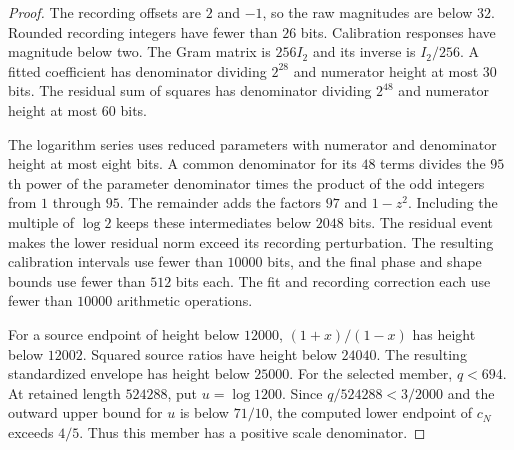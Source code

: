 \begin{proof}
The recording offsets are $2$ and $-1$, so the raw magnitudes are below $32$. Rounded recording integers have fewer than $26$ bits. Calibration responses have magnitude below two. The Gram matrix is $256I_2$ and its inverse is $I_2/256$. A fitted coefficient has denominator dividing $2^{28}$ and numerator height at most $30$ bits. The residual sum of squares has denominator dividing $2^{48}$ and numerator height at most $60$ bits.

The logarithm series uses reduced parameters with numerator and denominator height at most eight bits. A common denominator for its $48$ terms divides the $95$th power of the parameter denominator times the product of the odd integers from $1$ through $95$. The remainder adds the factors $97$ and $1-z^2$. Including the multiple of $\log2$ keeps these intermediates below $2048$ bits. The residual event makes the lower residual norm exceed its recording perturbation. The resulting calibration intervals use fewer than $10000$ bits, and the final phase and shape bounds use fewer than $512$ bits each. The fit and recording correction each use fewer than $10000$ arithmetic operations.

For a source endpoint of height below $12000$, $(1+x)/(1-x)$ has height below $12002$. Squared source ratios have height below $24040$. The resulting standardized envelope has height below $25000$. For the selected member, $q<694$. At retained length $524288$, put $u=\log1200$. Since $q/524288<3/2000$ and the outward upper bound for $u$ is below $71/10$, the computed lower endpoint of $c_N$ exceeds $4/5$. Thus this member has a positive scale denominator.


\end{proof}

